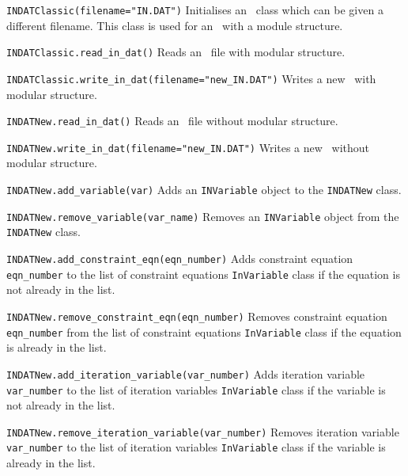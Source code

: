 \begin{description}

\item{\verb|INDATClassic(filename="IN.DAT")| } Initialises an \indat\ class
  which can be given a different filename. This class is used for an \indat\
  with a module structure.

\item{\verb|INDATClassic.read_in_dat()| } Reads an \indat\ file with modular
  structure.

\item{\verb|INDATClassic.write_in_dat(filename="new_IN.DAT")| } Writes a new
  \indat\ with modular structure.

\item{\verb|INDATNew.read_in_dat()| } Reads an \indat\ file without modular
  structure.

\item{\verb|INDATNew.write_in_dat(filename="new_IN.DAT")| } Writes a new
  \indat\ without modular structure.

\item{\verb|INDATNew.add_variable(var)| } Adds an \verb|INVariable| object to
  the \verb|INDATNew| class.

\item{\verb|INDATNew.remove_variable(var_name)| } Removes an
  \verb|INVariable| object from the \verb|INDATNew| class.

\item{\verb|INDATNew.add_constraint_eqn(eqn_number)|} Adds constraint
  equation \verb|eqn_number| to the list of constraint equations
  \verb|InVariable| class if the equation is not already in the list.

\item{\verb|INDATNew.remove_constraint_eqn(eqn_number)|} Removes
  constraint equation \verb|eqn_number| from the list of constraint
  equations \verb|InVariable| class if the equation is already in the list.

\item{\verb|INDATNew.add_iteration_variable(var_number)| } Adds iteration
  variable \verb|var_number| to the list of iteration variables
  \verb|InVariable| class if the variable is not already in the list.

\item{\verb|INDATNew.remove_iteration_variable(var_number)| } Removes
  iteration variable \verb|var_number| to the list of iteration variables
  \verb|InVariable| class if the variable is already in the list.

\end{description}

